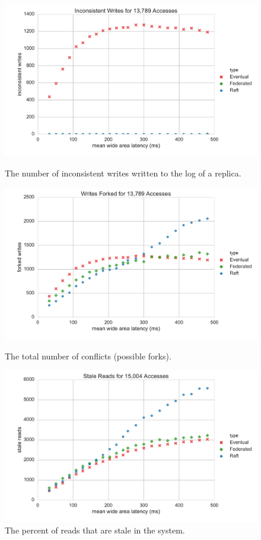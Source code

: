 \documentclass[10pt,conference,compsocconf,letterpaper]{IEEEtran}
\begin{document}
\begin{figure}
    \centering
      \includegraphics[width=\linewidth]{figures/latency/inconsistent_writes}
      \caption{The number of inconsistent writes written to the log of a replica.}\label{fig:latency_inconsistent_writes}
    \endminipage\hfill
      \includegraphics[width=\linewidth]{figures/latency/forked_writes}
      \caption{The total number of conflicts (possible forks).}\label{fig:latency_forked_writes}
    \endminipage\hfill
      \includegraphics[width=\linewidth]{figures/latency/stale_reads}
      \caption{The percent of reads that are stale in the system.}\label{fig:latency_stale_reads}
    \endminipage
\end{figure}
\end{document}
